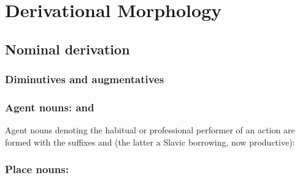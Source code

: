 \chapter{Derivational Morphology}\label{ch:derivational}


\section{Nominal derivation}

\subsection{Diminutives and augmentatives}


\subsection{Agent nouns:  and }

Agent nouns denoting the habitual or professional performer of an action are formed with the suffixes  and  (the latter a Slavic borrowing, now productive):


\subsection{Place nouns: }


